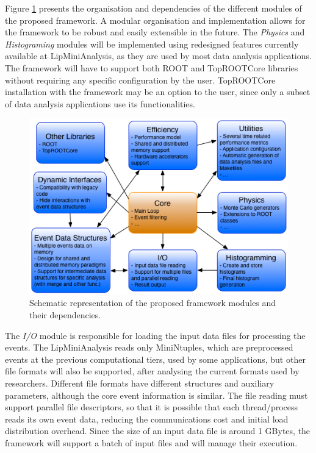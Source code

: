 Figure \ref{fig:new_framework} presents the organisation and dependencies of the different modules of the proposed framework. A modular organisation and implementation allows for the framework to be robust and easily extensible in the future. The \textit{Physics} and \textit{Histograming} modules will be implemented using redesigned features currently available at LipMiniAnalysis, as they are used by most data analysis applications. The framework will have to support both ROOT and TopROOTCore libraries without requiring any specific configuration by the user. TopROOTCore installation with the framework may be an option to the user, since only a subset of data analysis applications use its functionalities.

\begin{figure}[!htp]
	\begin{center}
		\includegraphics[scale=0.7]{imgs/new_framework.png}
		\caption{Schematic representation of the proposed framework modules and their dependencies.}
		\label{fig:new_framework}
	\end{center}
\end{figure}

The \textit{I/O} module is responsible for loading the input data files for processing the events. The LipMiniAnalysis reads only MiniNtuples, which are preprocessed events at the previous computational tiers, used by some applications, but other file formats will also be supported, after analysing the current formats used by researchers. Different file formats have different structures and auxiliary parameters, although the core event information is similar. The file reading must support parallel file descriptors, so that it is possible that each thread/process reads its own event data, reducing the communications cost and initial load distribution overhead. Since the size of an input data file is around 1 GBytes, the framework will support a batch of input files and will manage their execution.

